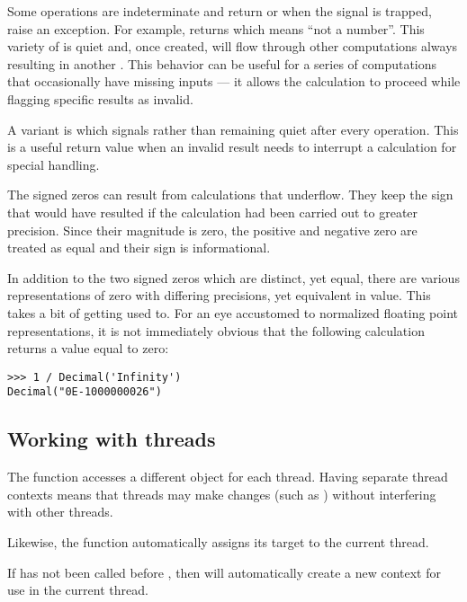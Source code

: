Some operations are indeterminate and return  or when the
 signal is trapped, raise an exception.  For
example,  returns  which means ``not a number''.  This
variety of  is quiet and, once created, will flow through other
computations always resulting in another .  This behavior can be
useful for a series of computations that occasionally have missing inputs ---
it allows the calculation to proceed while flagging specific results as
invalid.     

A variant is  which signals rather than remaining quiet
after every operation.  This is a useful return value when an invalid
result needs to interrupt a calculation for special handling.

The signed zeros can result from calculations that underflow.
They keep the sign that would have resulted if the calculation had
been carried out to greater precision.  Since their magnitude is
zero, the positive and negative zero are treated as equal and their
sign is informational.

In addition to the two signed zeros which are distinct, yet equal,
there are various representations of zero with differing precisions,
yet equivalent in value.  This takes a bit of getting used to.  For
an eye accustomed to normalized floating point representations, it
is not immediately obvious that the following calculation returns
a value equal to zero:          

\begin{verbatim}
>>> 1 / Decimal('Infinity')
Decimal("0E-1000000026")
\end{verbatim}

\subsection{Working with threads \label{decimal-threads}}

The  function accesses a different 
object for each thread.  Having separate thread contexts means that threads
may make changes (such as ) without interfering with
other threads.

Likewise, the  function automatically assigns its target
to the current thread.

If  has not been called before ,
then  will automatically create a new context for use
in the current thread.

